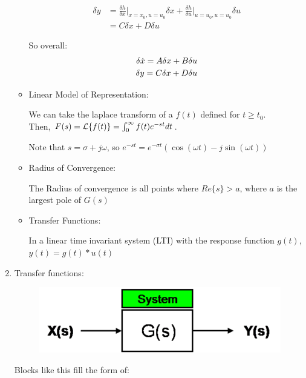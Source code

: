 \begin{enumerate}
\begin{itemize}
                \begin{align*}
                    \delta y &= \frac{\delta h}{\delta x} \Big|_{x=x_0, u = u_0} \delta x + \frac{\delta h}{\delta u} \Big|_{u=u_0, u = u_0} \delta u \\
                    &= C \delta x + D \delta u
                \end{align*}

                So overall:
                \begin{align*}
                    \delta \dot{x} = A \delta x + B \delta u \\
                    \delta y = C \delta x + D \delta u
                \end{align*}

            \item Linear Model of Representation:

                We can take the laplace transform of a $f(t)$ defined for $t \ge t_0$. \\

                Then, $F(s) = \mathcal{L}\{ f(t)\} = \int_{0}^{\infty}{f(t) e^{-st}dt}$.

                Note that $s = \sigma + j \omega$, so $e^{-st} = e^{-\sigma t} (\cos(\omega t) - j\sin(\omega t))$

            \item Radius of Convergence:

                The Radius of convergence is all points where $Re\{s\} > a$, where $a$ is the largest pole of $G(s)$

            \item Transfer Functions:

                In a linear time invariant system (LTI) with the response function $g(t)$, $y(t) = g(t)*u(t)$
        \end{itemize}
    \item Transfer functions:

        \begin{figure}[h]
            \centering
            \includegraphics{images/400px-Transfer_Function_Block.png}
        \end{figure}
        Blocks like this fill the form of:


\end{enumerate}
